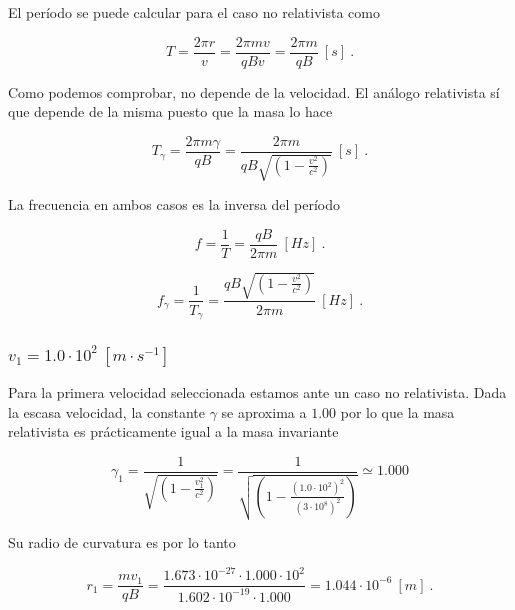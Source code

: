 \documentclass[journal]{IEEEtran}
\begin{document}
El período se puede calcular para el caso no relativista como

\begin{equation}
T = \displaystyle\frac{2\pi r}{v} = \displaystyle\frac{2\pi mv}{qBv} = \displaystyle\frac{2\pi m}{qB}~[s]~.
\end{equation}

Como podemos comprobar, no depende de la velocidad. El análogo relativista sí que depende de la misma puesto que la masa lo hace

\begin{equation}
T_\gamma = \displaystyle\frac{2\pi m\gamma}{qB} = \displaystyle\frac{2\pi m}{qB\sqrt{(1-\displaystyle\frac{v^2}{c^2})}} ~[s]~.
\end{equation}

La frecuencia en ambos casos es la inversa del período

\begin{equation}
    f = \displaystyle\frac{1}{T} = \displaystyle\frac{qB}{2\pi m}~[Hz]~.
\end{equation}

\begin{equation}
    f_\gamma = \displaystyle\frac{1}{T_\gamma} = \displaystyle\frac{qB\sqrt{(1-\displaystyle\frac{v^2}{c^2})}}{2\pi m}~[Hz]~.
\end{equation}

\subsubsection{$v_1 = 1.0\cdot 10^2~[m\cdot s^{-1}]$}

Para la primera velocidad seleccionada estamos ante un caso no relativista. Dada la escasa velocidad, la constante $\gamma$ se aproxima a $1.00$ por lo que la masa relativista es prácticamente igual a la masa invariante

\begin{equation}
\gamma_1 = \displaystyle\frac{1}{\sqrt{(1-\displaystyle\frac{v_1^2}{c^2})}} = \displaystyle\frac{1}{\sqrt{(1-\displaystyle\frac{(1.0\cdot 10^2)^2}{(3\cdot 10^8)^2})}} \simeq 1.000
\end{equation}

Su radio de curvatura es por lo tanto

\begin{equation}
r_1 = \displaystyle\frac{mv_1}{qB} = \displaystyle\frac{1.673\cdot 10^{-27}\cdot 1.000\cdot 10^2}{1.602\cdot 10^{-19}\cdot 1.000} = 1.044\cdot 10^{-6}~[m]~.
\end{equation}
\end{document}
